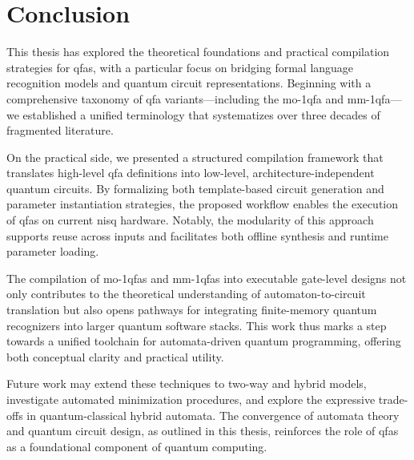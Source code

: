 \chapter{Conclusion}
\label{chap:conclusion}
 
This thesis has explored the theoretical foundations and practical compilation strategies for \glspl{qfa}, with a particular focus on bridging formal language recognition models and quantum circuit representations. Beginning with a comprehensive taxonomy of \gls{qfa} variants—including the \gls{mo-1qfa} and \gls{mm-1qfa}—we established a unified terminology that systematizes over three decades of fragmented literature.

On the practical side, we presented a structured compilation framework that translates high-level \gls{qfa} definitions into low-level, architecture-independent quantum circuits. By formalizing both template-based circuit generation and parameter instantiation strategies, the proposed workflow enables the execution of \glspl{qfa} on current \gls{nisq} hardware. Notably, the modularity of this approach supports reuse across inputs and facilitates both offline synthesis and runtime parameter loading.

The compilation of \glspl{mo-1qfa} and \glspl{mm-1qfa} into executable gate-level designs not only contributes to the theoretical understanding of automaton-to-circuit translation but also opens pathways for integrating finite-memory quantum recognizers into larger quantum software stacks. This work thus marks a step towards a unified toolchain for automata-driven quantum programming, offering both conceptual clarity and practical utility.

Future work may extend these techniques to two-way and hybrid models, investigate automated minimization procedures, and explore the expressive trade-offs in quantum-classical hybrid automata. The convergence of automata theory and quantum circuit design, as outlined in this thesis, reinforces the role of \glspl{qfa} as a foundational component of quantum computing.
